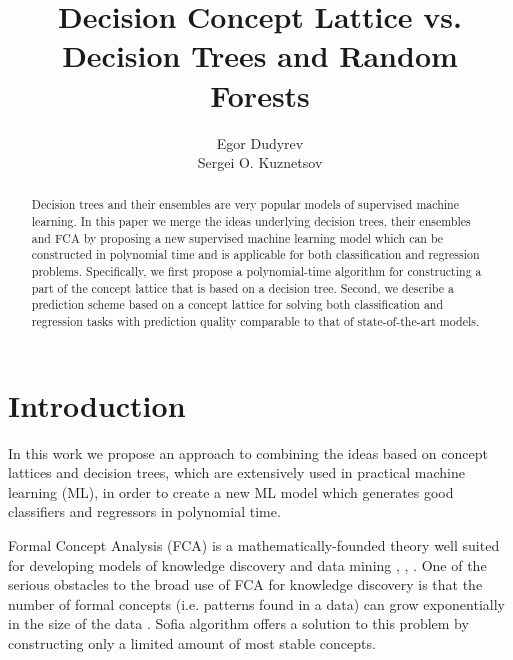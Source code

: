 \documentclass[runningheads]{llncs}
\begin{document}
%
\title{Decision Concept Lattice vs. Decision Trees and Random Forests}
%
%
\author{Egor Dudyrev \\ 
Sergei O. Kuznetsov}
%
%
%
\maketitle              %
%
\begin{abstract}
Decision trees and their ensembles are very popular models of supervised machine learning. 
In this paper we merge the ideas underlying decision trees, their ensembles and FCA by proposing a new supervised machine learning model which can be constructed in polynomial time and is applicable for both classification and regression problems. Specifically, we first propose a polynomial-time algorithm for constructing a part of the concept lattice that is based on a decision tree. Second, we describe a prediction scheme based on a concept lattice for solving both classification and regression tasks with prediction quality comparable to that of state-of-the-art models.


\end{abstract}
%
%
%
\section{Introduction}

In this work we propose an approach to combining the ideas based on concept lattices and  decision trees, which are extensively used in practical machine learning (ML), in order to create a new ML model which generates good classifiers and regressors in polynomial time.

Formal Concept Analysis (FCA) is a mathematically-founded theory well suited for developing models of knowledge discovery and data mining \cite{FCA}, \cite{Genes}, \cite{MiningCare}. 
One of the serious obstacles to the broad use of FCA for knowledge discovery is that the number of formal concepts (i.e. patterns found in a data) can grow exponentially in the size of the data  \cite{KuznetsovCompare}. Sofia algorithm  \cite{Sofia} offers a solution to this problem by constructing only a limited amount of most stable concepts.
\end{document}
